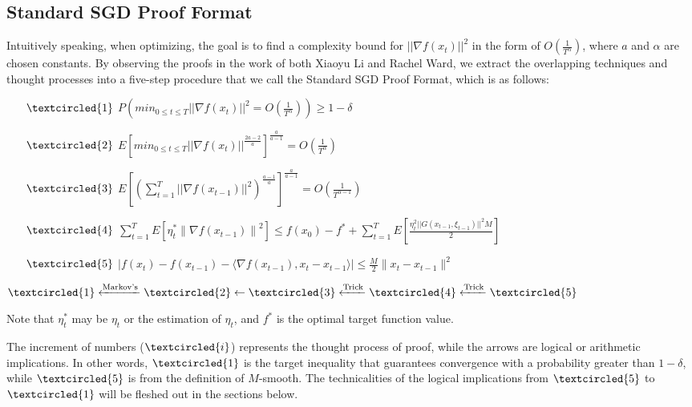 \documentclass[14pt,onecolumn,letterpaper]{extarticle}
\begin{document}
\subsection{Standard SGD Proof Format}
Intuitively speaking, when optimizing, the goal is to find a complexity bound for $||\nabla f(x_t)||^2$ in the form of $O(\frac{1}{T^\alpha})$, where $a$ and $\alpha$ are chosen constants. By observing the proofs in the work of both Xiaoyu Li and Rachel Ward, we extract the overlapping techniques and thought processes into a five-step procedure that we call the Standard SGD Proof Format, which is as follows:
\begin{enumerate}
        \item [$\textcircled{1}$] $P(min_{0 \leq t \leq T}||\nabla f(x_t)||^2 = O(\frac{1}{T^\alpha})) \geq 1 - \delta$
        \item [$\textcircled{2}$] $E\left[min_{0 \leq t \leq T}||\nabla f(x_t)||^{\frac{2a-2}{a}}\right]^{\frac{a}{a-1}} = O(\frac{1}{T^{\alpha}})$
        
        \item [$\textcircled{3}$] $E\left[(\sum_{t=1}^{T}||\nabla f(x_{t-1})||^2)^\frac{a-1}{a}\right]^{\frac{a}{a-1}} = O(\frac{1}{T^{\alpha - 1}})$
        
        \item [$\textcircled{4}$] $ \sum_{t=1}^{T}  E\left[\eta_t^*\left\|\nabla f\left(x_{t-1}\right)\right\|^2\right] \leq f\left(x_0\right)-f^*+\sum_{t=1}^{T} E\left[\frac{\eta_t^2 ||G(x_{t-1}, \xi_{t-1})||^2 M}{2}\right]$

        \item [$\textcircled{5}$] $|f(x_t)-f(x_{t-1})-\langle\nabla f(x_{t-1}), x_t-x_{t-1}\rangle| \leq \frac{M}{2}\|x_t-x_{t-1}\|^2$
\end{enumerate} \par

$\textcircled{1} \xleftarrow{\text{Markov's}} \textcircled{2} \leftarrow \textcircled{3} \xleftarrow{\text{Trick}} \textcircled{4} \xleftarrow{\text{Trick}} \textcircled{5}$\par
Note that $\eta_t^*$ may be $\eta_t$ or the estimation of $\eta_t$, and $f^*$ is the optimal target function value.\par
The increment of numbers ($\textcircled{i}$) represents the thought process of proof, while the arrows are logical or arithmetic implications. In other words, $\textcircled{1}$ is the target inequality that guarantees convergence with a probability greater than $1-\delta$, while $\textcircled{5}$ is from the definition of $M$-smooth. The technicalities of the logical implications from $\textcircled{5}$ to $\textcircled{1}$ will be fleshed out in the sections below.
\end{document}

